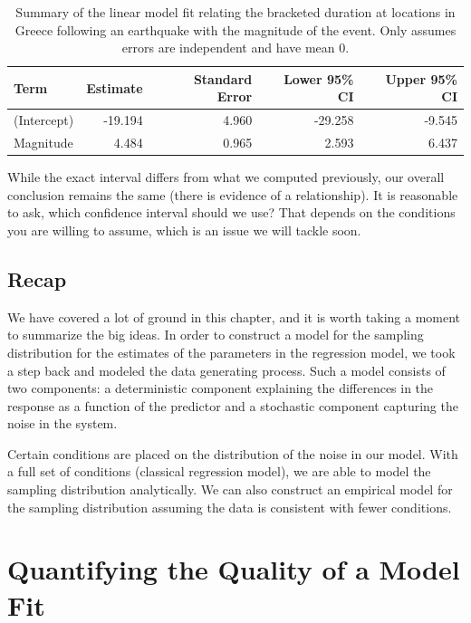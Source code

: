 \documentclass[]{book}
\theoremstyle{plain}
\theoremstyle{mydefn}
\theoremstyle{myexmpl}
\theoremstyle{remark}
\begin{document}
\begin{table}

\caption{\label{tab:regconditions-slr-summary-alt}Summary of the linear model fit relating the bracketed duration at locations in Greece following an earthquake with the magnitude of the event. Only assumes errors are independent and have mean 0.}
\centering
\begin{tabular}[t]{l|r|r|r|r}
\hline
Term & Estimate & Standard Error & Lower 95\% CI & Upper 95\% CI\\
\hline
(Intercept) & -19.194 & 4.960 & -29.258 & -9.545\\
\hline
Magnitude & 4.484 & 0.965 & 2.593 & 6.437\\
\hline
\end{tabular}
\end{table}

While the exact interval differs from what we computed previously, our
overall conclusion remains the same (there is evidence of a
relationship). It is reasonable to ask, which confidence interval should
we use? That depends on the conditions you are willing to assume, which
is an issue we will tackle soon.

\section{Recap}\label{recap}

We have covered a lot of ground in this chapter, and it is worth taking
a moment to summarize the big ideas. In order to construct a model for
the sampling distribution for the estimates of the parameters in the
regression model, we took a step back and modeled the data generating
process. Such a model consists of two components: a deterministic
component explaining the differences in the response as a function of
the predictor and a stochastic component capturing the noise in the
system.

Certain conditions are placed on the distribution of the noise in our
model. With a full set of conditions (classical regression model), we
are able to model the sampling distribution analytically. We can also
construct an empirical model for the sampling distribution assuming the
data is consistent with fewer conditions.

\chapter{Quantifying the Quality of a Model Fit}\label{Regquality}
\end{document}
